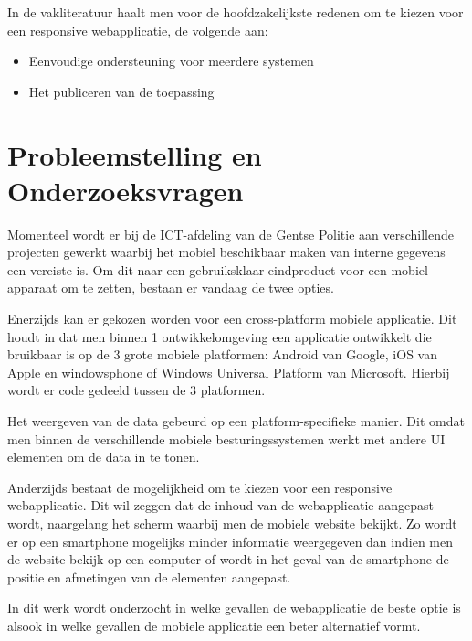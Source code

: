 In de vakliteratuur haalt men voor de hoofdzakelijkste redenen om te kiezen voor een responsive webapplicatie, de volgende aan:
\begin{itemize}
  \item{Eenvoudige ondersteuning voor meerdere systemen}
  \item{Het publiceren van de toepassing}
\end{itemize}



\section{Probleemstelling en Onderzoeksvragen}
\label{sec:onderzoeksvragen}


Momenteel wordt er bij de ICT-afdeling van de Gentse Politie aan verschillende projecten gewerkt waarbij het
mobiel beschikbaar maken van interne gegevens een vereiste is.
Om dit naar een gebruiksklaar eindproduct voor een mobiel apparaat om te zetten, bestaan er vandaag de twee opties.

Enerzijds kan er gekozen worden voor een cross-platform mobiele applicatie.
Dit houdt in dat men binnen 1 ontwikkelomgeving een applicatie ontwikkelt die bruikbaar is op de
3 grote mobiele platformen: Android van Google, iOS van Apple en windowsphone of
Windows Universal Platform van Microsoft.
Hierbij wordt er code gedeeld tussen de 3 platformen.

Het weergeven van de data gebeurd op een platform-specifieke manier.
Dit omdat men binnen de verschillende mobiele besturingssystemen werkt met andere UI elementen om de data in te tonen.

Anderzijds bestaat de mogelijkheid om te kiezen voor een responsive webapplicatie.
Dit wil zeggen dat de inhoud van de webapplicatie aangepast wordt,
 naargelang het scherm waarbij men de mobiele website bekijkt.
Zo wordt er op een smartphone mogelijks minder informatie weergegeven dan indien men de website bekijk op een computer of
wordt in het geval van de smartphone de positie en afmetingen van de elementen aangepast.

In dit werk wordt onderzocht in welke gevallen de webapplicatie de beste optie is alsook in welke gevallen de mobiele applicatie
een beter alternatief vormt.

